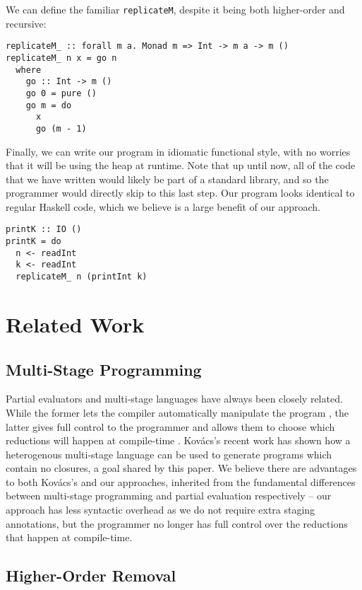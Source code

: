 \documentclass[runningheads]{llncs}
\begin{document}
We can define the familiar \texttt{replicateM}, despite it being both higher-order and recursive:

\begin{verbatim}
replicateM_ :: forall m a. Monad m => Int -> m a -> m ()
replicateM_ n x = go n
  where
    go :: Int -> m ()
    go 0 = pure ()
    go m = do
      x
      go (m - 1)
\end{verbatim}

Finally, we can write our program in idiomatic functional style, with no worries that it will be using the heap at runtime. Note that up until now, all of the code that we have written would likely be part of a standard library, and so the programmer would directly skip to this last step. Our program looks identical to regular Haskell code, which we believe is a large benefit of our approach.

\begin{verbatim}
printK :: IO ()
printK = do
  n <- readInt
  k <- readInt
  replicateM_ n (printInt k)
\end{verbatim}


\section{Related Work}

\subsection{Multi-Stage Programming}

Partial evaluators and multi-stage languages have always been closely related. While the former lets the compiler automatically manipulate the program \cite{jones1996introduction}, the latter gives full control to the programmer and allows them to choose which reductions will happen at compile-time \cite{taha2004gentle}. Kovács's recent work \cite{kovacs2024closure} has shown how a heterogenous multi-stage language can be used to generate programs which contain no closures, a goal shared by this paper. We believe there are advantages to both Kovács's and our approaches, inherited from the fundamental differences between multi-stage programming and partial evaluation respectively -- our approach has less syntactic overhead as we do not require extra staging annotations, but the programmer no longer has full control over the reductions that happen at compile-time.

\subsection{Higher-Order Removal}
\end{document}
